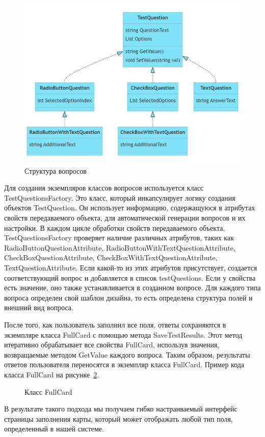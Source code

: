 \begin{figure}
  \includegraphics[scale=0.4]{inc/questions.png}
  \caption{Структура вопросов}
  \label{fig:questions}
\end{figure}


Для создания экземпляров классов вопросов используется класс TestQuestionsFactory. Это класс, который инкапсулирует логику создания объектов TestQuestion. Он использует информацию, содержащуюся в атрибутах свойств передаваемого объекта, для автоматической генерации вопросов и их настройки. В каждом цикле обработки свойств передаваемого объекта, TestQuestionsFactory проверяет наличие различных атрибутов, таких как RadioButtonQuestionAttribute, RadioButtonWithTextQuestionAttribute, CheckBoxQuestionAttribute, CheckBoxWithTextQuestionAttribute, TextQuestionAttribute. Если какой-то из этих атрибутов присутствует, создается соответствующий вопрос и добавляется в список testQuestions. Если у свойства есть значение, оно также устанавливается в созданном вопросе. Для каждого типа вопроса определен свой шаблон дизайна, то есть определена структура полей и внешний вид вопроса.

После того, как пользователь заполнил все поля, ответы сохраняются в экземпляре класса FullCard с помощью метода SaveTestResults. Этот метод итеративно обрабатывает все свойства FullCard, используя значения, возвращаемые методом GetValue каждого вопроса. Таким образом, результаты ответов пользователя переносятся в экземпляр класса FullCard. Пример кода класса FullCard на рисунке~\ref{src:question}.

\begin{figure}

\caption{Класс FullCard}
\label{src:question}
\end{figure}

В результате такого подхода мы получаем гибко настраиваемый интерфейс страницы заполнения карты, который может отображать любой тип поля, определенный в нашей системе.